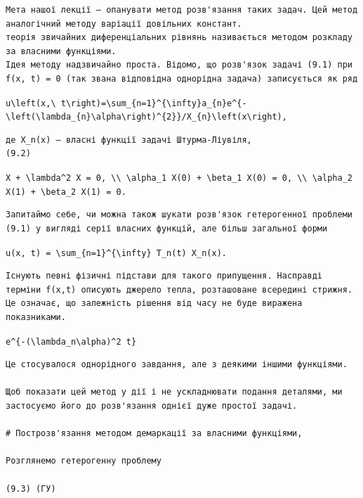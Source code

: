 \documentclass[
  ukrainian,
]{article}
\begin{document}
\begin{verbatim}
Мета нашої лекції — опанувати метод розв'язання таких задач. Цей метод аналогічний методу варіації довільних констант.
теорія звичайних диференціальних рівнянь називається методом розкладу за власними функціями.
Ідея методу надзвичайно проста. Відомо, що розв'язок задачі (9.1) при f(x, t) = 0 (так звана відповідна однорідна задача) записується як ряд
\end{verbatim}

\texttt{u\textbackslash{}left(x,\textbackslash{}\ t\textbackslash{}right)=\textbackslash{}sum\_\{n=1\}\^{}\{\textbackslash{}infty\}a\_\{n\}e\^{}\{-\textbackslash{}left(\textbackslash{}lambda\_\{n\}\textbackslash{}alpha\textbackslash{}right)\^{}\{2\}\}/X\_\{n\}\textbackslash{}left(x\textbackslash{}right),}

\begin{verbatim}
де X_n(x) — власні функції задачі Штурма-Ліувіля,
(9.2)
\end{verbatim}

\texttt{X\textquotesingle{}\textquotesingle{}\ +\ \textbackslash{}lambda\^{}2\ X\ =\ 0,\ \textbackslash{}\textbackslash{}\ \textbackslash{}alpha\_1\ X\textquotesingle{}(0)\ +\ \textbackslash{}beta\_1\ X(0)\ =\ 0,\ \textbackslash{}\textbackslash{}\ \textbackslash{}alpha\_2\ X\textquotesingle{}(1)\ +\ \textbackslash{}beta\_2\ X(1)\ =\ 0.}

\begin{verbatim}
Запитаймо себе, чи можна також шукати розв'язок гетерогенної проблеми (9.1) у вигляді серії власних функцій, але більш загальної форми
\end{verbatim}

\texttt{u(x,\ t)\ =\ \textbackslash{}sum\_\{n=1\}\^{}\{\textbackslash{}infty\}\ T\_n(t)\ X\_n(x).}

\begin{verbatim}
Існують певні фізичні підстави для такого припущення. Насправді терміни f(x,t) описують джерело тепла, розташоване всередині стрижня. Це означає, що залежність рішення від часу не буде виражена показниками.
\end{verbatim}

\texttt{e\^{}\{-(\textbackslash{}lambda\_n\textbackslash{}alpha)\^{}2\ t\}}

\begin{verbatim}
Це стосувалося однорідного завдання, але з деякими іншими функціями.

Щоб показати цей метод у дії і не ускладнювати подання деталями, ми застосуємо його до розв'язання однієї дуже простої задачі.

# Построзв'язання методом демаркації за власними функціями,

Розглянемо гетерогенну проблему

(9.3) (ГУ)
\end{verbatim}
\end{document}
